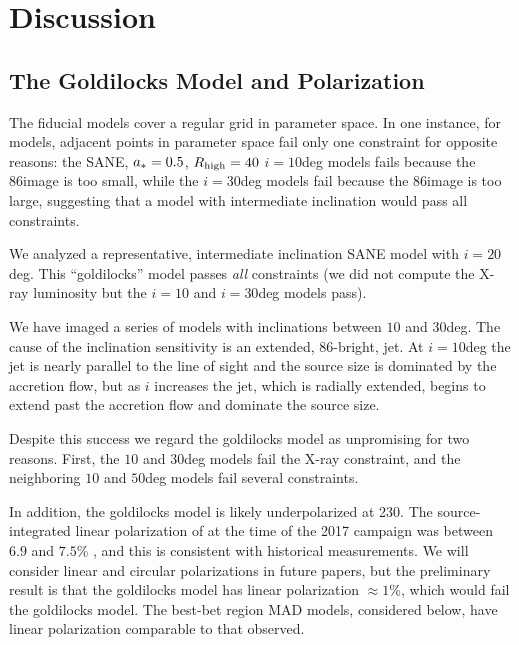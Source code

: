 \section{Discussion}
\label{sec:discussions}

\subsection{The Goldilocks Model and Polarization}

The fiducial models cover a regular grid in parameter space.
In one instance, for \kharma models, adjacent points in parameter space fail only one constraint for opposite reasons: the SANE, $a_* = 0.5$, $R_\mathrm{high} = 40$ $i = 10$deg models fails because the 86\GHz image is too small, while the $i = 30$deg models fail because the 86\GHz image is too large, suggesting  that a model with intermediate inclination would pass all constraints.

We analyzed a representative, intermediate inclination \kharma SANE model with $i = 20$deg.
This ``goldilocks'' model passes {\em all} constraints (we did not compute  the X-ray luminosity but the $i=10$ and $i=30$deg models pass).

We have imaged a series of \kharma models with inclinations between $10$ and $30$deg.
The cause of the inclination sensitivity is an extended, 86\GHz-bright, jet.
At $i = 10$deg the jet is nearly parallel to the line of sight and the source size is dominated by the accretion flow, but as $i$ increases the jet, which is radially extended, begins to extend past the accretion flow and dominate the source size.

Despite this success we regard the goldilocks model as unpromising for two reasons.
First, the $10$ and $30$deg \bhac models fail the X-ray constraint, and the neighboring $10$ and $50$deg \hamr models fail several constraints.

In addition, the goldilocks model is likely underpolarized at 230\GHz.
The source-integrated linear polarization of \sgra at the time of the 2017 campaign was between $6.9$ and $7.5$\% \citep{2021ApJ...910L..14G}, and this is consistent with historical measurements.
We will consider linear and circular polarizations in future papers, but the preliminary result is that the goldilocks model has linear polarization $\approx 1$\%, which would fail the goldilocks model.
The best-bet region MAD models, considered below, have linear polarization comparable to that observed.

